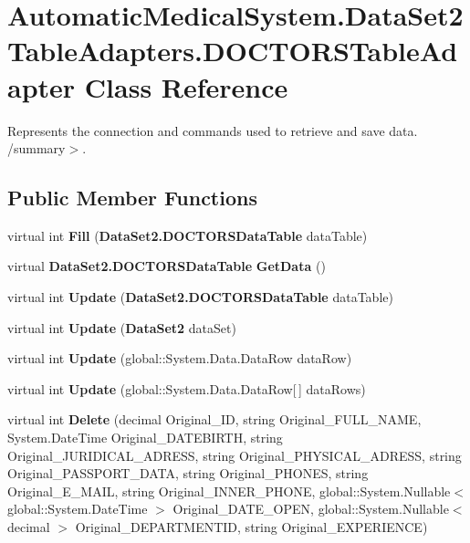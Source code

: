 \section{AutomaticMedicalSystem.DataSet2TableAdapters.DOCTORSTableAdapter Class Reference}
\label{class_automatic_medical_system_1_1_data_set2_table_adapters_1_1_d_o_c_t_o_r_s_table_adapter}
Represents the connection and commands used to retrieve and save data. /summary$>$.  


\subsection*{Public Member Functions}
\begin{CompactItemize}
\item 
virtual int \textbf{Fill} ({\bf DataSet2.DOCTORSDataTable} dataTable)\label{class_automatic_medical_system_1_1_data_set2_table_adapters_1_1_d_o_c_t_o_r_s_table_adapter_26d23806589bd7557135c96f4222144b}

\item 
virtual {\bf DataSet2.DOCTORSDataTable} \textbf{GetData} ()\label{class_automatic_medical_system_1_1_data_set2_table_adapters_1_1_d_o_c_t_o_r_s_table_adapter_0d062783b5541ce0f1af26c421840407}

\item 
virtual int \textbf{Update} ({\bf DataSet2.DOCTORSDataTable} dataTable)\label{class_automatic_medical_system_1_1_data_set2_table_adapters_1_1_d_o_c_t_o_r_s_table_adapter_0f31f0b9fe5c0b1d6e279c0cf9bc447b}

\item 
virtual int \textbf{Update} ({\bf DataSet2} dataSet)\label{class_automatic_medical_system_1_1_data_set2_table_adapters_1_1_d_o_c_t_o_r_s_table_adapter_5d16b53eebb5c22860981b29d6836437}

\item 
virtual int \textbf{Update} (global::System.Data.DataRow dataRow)\label{class_automatic_medical_system_1_1_data_set2_table_adapters_1_1_d_o_c_t_o_r_s_table_adapter_d7238c2b8a5ad2fad0af05bdc30f3182}

\item 
virtual int \textbf{Update} (global::System.Data.DataRow[$\,$] dataRows)\label{class_automatic_medical_system_1_1_data_set2_table_adapters_1_1_d_o_c_t_o_r_s_table_adapter_52fdf3131b616f30484cd16fbb1c1060}

\item 
virtual int \textbf{Delete} (decimal Original\_\-ID, string Original\_\-FULL\_\-NAME, System.DateTime Original\_\-DATEBIRTH, string Original\_\-JURIDICAL\_\-ADRESS, string Original\_\-PHYSICAL\_\-ADRESS, string Original\_\-PASSPORT\_\-DATA, string Original\_\-PHONES, string Original\_\-E\_\-MAIL, string Original\_\-INNER\_\-PHONE, global::System.Nullable$<$ global::System.DateTime $>$ Original\_\-DATE\_\-OPEN, global::System.Nullable$<$ decimal $>$ Original\_\-DEPARTMENTID, string Original\_\-EXPERIENCE)\label{class_automatic_medical_system_1_1_data_set2_table_adapters_1_1_d_o_c_t_o_r_s_table_adapter_419ece309dc81c73fbeb3664d9cfd0c9}


\end{CompactItemize}
